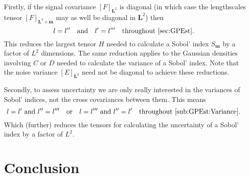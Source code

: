 \documentclass[preprint,12pt]{elsarticle}
\newcommand*{\M}[1]{\ensuremath{#1}\xspace}
\newcommand*{\x}{\times}
\newcommand*{\mi}[1]{\mathbf{#1}}
\newcommand*{\te}[2][]{\left\lbrack{#2}\right\rbrack_{#1}}
\newcommand{\T}[1]{\text{#1}}
\newcommand*{\QT}[2][]{\M{\quad\T{#2}\ifthenelse{\equal{#1}{}}{\quad}{#1}}}
\begin{document}
        Firstly, if the signal covariance $\te[\mi{L}^{2}]{F}$ is diagonal (in which case the lengthscales tensor $\te[\mi{L}^{2}\x\mi{m}]{F}$ may as well be diagonal in $\mi{L}^{2}$) then
        \begin{equation*}
            l = l^{\prime\prime} \QT{and} l^{\prime} = l^{\prime\prime\prime} \QT{throughout \cref{sec:GPEst}.}   
        \end{equation*}
        This reduces the largest tensor $H$ needed to calculate a Sobol' index $S_{\mi{m}}$ by a factor of $L^{2}$ dimensions. The same reduction applies to the Gaussian densities involving $C$ or $D$ needed to calculate the variance of a Sobol' index. Note that the noise variance $\te[\mi{L}^{2}]{E}$ need not be diagonal to achieve these reductions.

        Secondly, to assess uncertainty we are only really interested in the variances of Sobol' indices, not the cross covariances between them. This means
        \begin{equation*}
            l = l^{\prime} \T{ and } l^{\prime\prime} = l^{\prime\prime\prime} \QT{or} 
            l = l^{\prime\prime\prime} \T{ and } l^{\prime\prime} = l^{\prime} \QT{throughout \cref{sub:GPEst:Variance}.}   
        \end{equation*}
        Which (further) reduces the tensors for calculating the uncertainty of a Sobol' index by a factor of $L^{2}$.


\section{Conclusion}\label{sec:Conc}




 

\end{document}
